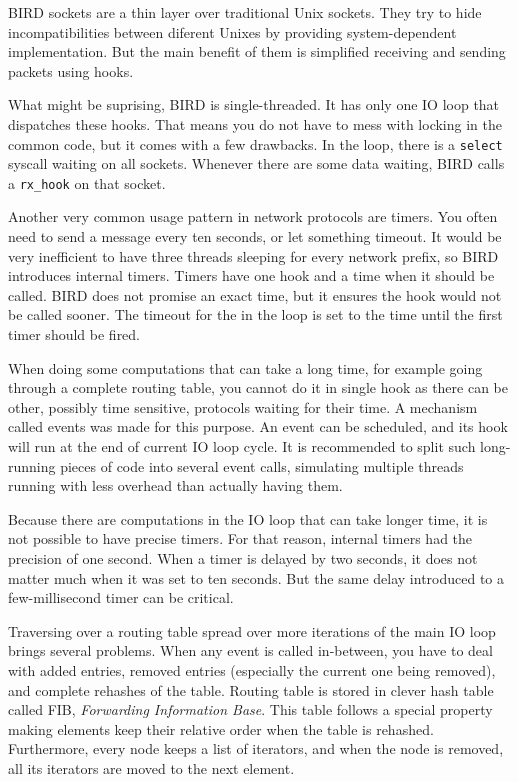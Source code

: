 BIRD sockets are a thin layer over traditional Unix sockets. They try to hide
incompatibilities between diferent Unixes by providing system-dependent
implementation. But the main benefit of them is simplified receiving and
sending packets using hooks.

What might be suprising, BIRD is single-threaded. It has only one IO loop that
dispatches these hooks. That means you do not have to mess with locking in the
common code, but it comes with a few drawbacks. In the loop, there is
a \texttt{select} syscall waiting on all sockets. Whenever there are some data
waiting, BIRD calls a \verb|rx_hook| on that socket.

Another very common usage pattern in network protocols are timers. You often
need to send a message every ten seconds, or let something timeout. It would be
very inefficient to have three threads sleeping for every network prefix, so BIRD
introduces internal timers. Timers have one hook and a time when it should be
called. BIRD does not promise an exact time, but it ensures the hook would not
be called sooner. The timeout for the  in the loop is set to the time
until the first timer should be fired.

When doing some computations that can take a long time, for example going
through a complete routing table, you cannot do it in single hook as there can be
other, possibly time sensitive, protocols waiting for their time. A mechanism
called events was made for this purpose. An event can be scheduled,
and its hook will run at the end of current IO loop cycle. It is recommended to
split such long-running pieces of code into several event calls, simulating
multiple threads running with less overhead than actually having them.

Because there are computations in the IO loop that can take longer time, it is
not possible to have precise timers. For that reason, internal timers had the
precision of one second. When a timer is delayed by two seconds, it does not
matter much when it was set to ten seconds. But the same delay introduced to
a few-millisecond timer can be critical.

Traversing over a routing table spread over more iterations of the main IO loop
brings several problems. When any event is called in-between, you have to deal
with added entries, removed entries (especially the current one being removed),
and complete rehashes of the table. Routing table is stored in clever hash
table called FIB, \emph{Forwarding Information Base}. This table follows
a special property making elements keep their relative order when the table is
rehashed. Furthermore, every node keeps a list of iterators, and when the node
is removed, all its iterators are moved to the next element.


